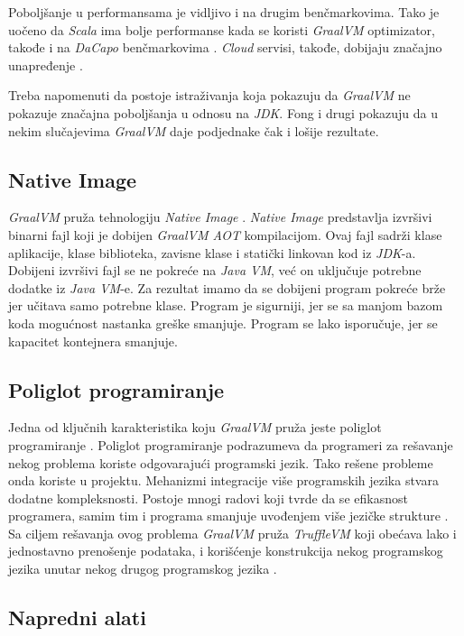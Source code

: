 \documentclass[a4paper]{article}
\begin{document}
Poboljšanje u performansama je vidljivo i na drugim benčmarkovima. Tako je uočeno da \emph{Scala} ima bolje performanse kada se koristi \emph{GraalVM} optimizator, takođe i na \emph{DaCapo} benčmarkovima \cite{stadler13, dacapo}. \emph{Cloud} servisi, takođe, dobijaju značajno unapređenje \cite{sipek21}. 

Treba napomenuti da postoje istraživanja koja pokazuju da \emph{GraalVM} ne pokazuje značajna poboljšanja u odnosu na \emph{JDK}. Fong i drugi \cite{fong21} pokazuju da u nekim slučajevima \emph{GraalVM} daje podjednake čak i lošije rezultate. 

\subsection{Native Image}
\label{sub:nim}

\emph{GraalVM} pruža tehnologiju \emph{Native Image} \cite{graalvm}. \emph{Native Image} predstavlja izvršivi binarni fajl koji je dobijen \emph{GraalVM AOT} kompilacijom. Ovaj fajl sadrži klase aplikacije, klase biblioteka, zavisne klase i statički linkovan kod iz \emph{JDK}-a. Dobijeni izvršivi fajl se ne pokreće na \emph{Java VM}, već on uključuje potrebne dodatke iz \emph{Java VM}-e. Za rezultat imamo da se dobijeni program pokreće brže jer učitava samo potrebne klase. Program je sigurniji, jer se sa manjom bazom koda mogućnost nastanka greške smanjuje. Program se lako isporučuje, jer se kapacitet kontejnera smanjuje.

\subsection{Poliglot programiranje}
\label{sub:poliglot}

Jedna od ključnih karakteristika koju \emph{GraalVM} pruža jeste poliglot programiranje \cite{graalvm}. Poliglot programiranje podrazumeva da programeri za rešavanje nekog problema koriste odgovarajući programski jezik. Tako rešene probleme onda koriste u projektu. Mehanizmi integracije više programskih jezika stvara dodatne kompleksnosti. Postoje mnogi radovi koji tvrde da se efikasnost programera, samim tim i programa smanjuje uvođenjem više jezičke strukture \cite{peterson21, hao20}. Sa ciljem rešavanja ovog problema \emph{GraalVM} pruža \emph{TruffleVM} koji obećava lako i jednostavno prenošenje podataka, i korišćenje konstrukcija nekog programskog jezika unutar nekog drugog programskog jezika \cite{grimmer15}.

\subsection{Napredni alati}
\label{sub:alati}
\end{document}
